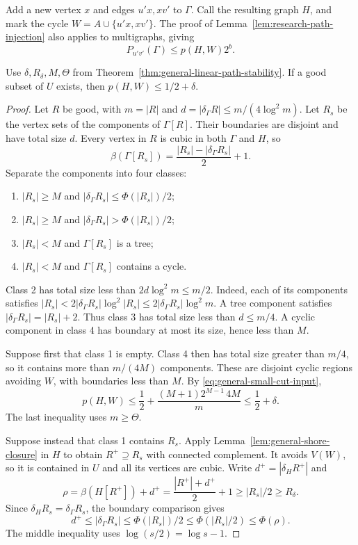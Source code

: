 Add a new vertex $x$ and edges $u'x,xv'$ to $\Gamma$.
Call the resulting graph $H$, and mark the cycle $W=A\cup\{u'x,xv'\}$.
The proof of Lemma~\ref{lem:research-path-injection} also applies to multigraphs, giving
\begin{equation}\label{eq:general-path-forest}
 P_{u'v'}(\Gamma)\le p(H,W)2^b.
\end{equation}

\begin{lemma}\label{lem:general-good-set}
Use $\delta,R_\delta,M,\Theta$ from Theorem~\ref{thm:general-linear-path-stability}.
If a good subset of $U$ exists, then $p(H,W)\le1/2+\delta$.
\end{lemma}

\begin{proof}
Let $R$ be good, with $m=|R|$ and $d=|\delta_\Gamma R|\le m/(4\log^2m)$.
Let $R_s$ be the vertex sets of the components of $\Gamma[R]$.
Their boundaries are disjoint and have total size $d$.
Every vertex in $R$ is cubic in both $\Gamma$ and $H$, so
\[
 \beta(\Gamma[R_s])=\frac{|R_s|-|\delta_\Gamma R_s|}{2}+1.
\]
Separate the components into four classes:
\begin{enumerate}
\item $|R_s|\ge M$ and $|\delta_\Gamma R_s|\le\Phi(|R_s|)/2$;
\item $|R_s|\ge M$ and $|\delta_\Gamma R_s|>\Phi(|R_s|)/2$;
\item $|R_s|<M$ and $\Gamma[R_s]$ is a tree;
\item $|R_s|<M$ and $\Gamma[R_s]$ contains a cycle.
\end{enumerate}

Class 2 has total size less than $2d\log^2m\le m/2$.
Indeed, each of its components satisfies
$|R_s|<2|\delta_\Gamma R_s|\log^2|R_s|\le2|\delta_\Gamma R_s|\log^2m$.
A tree component satisfies $|\delta_\Gamma R_s|=|R_s|+2$.
Thus class 3 has total size less than $d\le m/4$.
A cyclic component in class 4 has boundary at most its size, hence less than $M$.

Suppose first that class 1 is empty.
Class 4 then has total size greater than $m/4$, so it contains more than $m/(4M)$ components.
These are disjoint cyclic regions avoiding $W$, with boundaries less than $M$.
By \eqref{eq:general-small-cut-input},
\[
 p(H,W)\le\frac12+
 \frac{(M+1)2^{M-1}\,4M}{m}
 \le\frac12+\delta.
\]
The last inequality uses $m\ge\Theta$.

Suppose instead that class 1 contains $R_s$.
Apply Lemma~\ref{lem:general-shore-closure} in $H$ to obtain $R^+\supseteq R_s$ with connected complement.
It avoids $V(W)$, so it is contained in $U$ and all its vertices are cubic.
Write $d^+=|\delta_H R^+|$ and
\[
 \rho=\beta(H[R^+])+d^+
 =\frac{|R^+|+d^+}{2}+1
 \ge|R_s|/2\ge R_\delta.
\]
Since $\delta_HR_s=\delta_\Gamma R_s$, the boundary comparison gives
\[
 d^+\le|\delta_\Gamma R_s|
 \le\Phi(|R_s|)/2
 \le\Phi(|R_s|/2)
 \le\Phi(\rho).
\]
The middle inequality uses $\log(s/2)=\log s-1$.


\end{proof}
